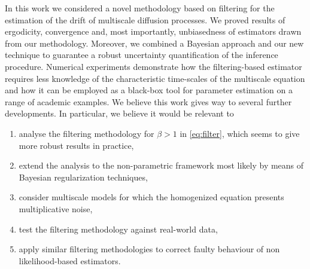 \documentclass[10pt]{article}
\begin{document}
In this work we considered a novel methodology based on filtering for the estimation of the drift of multiscale diffusion processes. We proved results of ergodicity, convergence and, most importantly, unbiasedness of estimators drawn from our methodology. Moreover, we combined a Bayesian approach and our new technique to guarantee a robust uncertainty quantification of the inference procedure. Numerical experiments demonstrate how the filtering-based estimator requires less knowledge of the characteristic time-scales of the multiscale equation and how it can be employed as a black-box tool for parameter estimation on a range of academic examples. We believe this work gives way to several further developments. In particular, we believe it would be relevant to 
\begin{enumerate}
	\item analyse the filtering methodology for $\beta > 1$ in \eqref{eq:filter}, which seems to give more robust results in practice,
	\item extend the analysis to the non-parametric framework most likely by means of Bayesian regularization techniques,
	\item consider multiscale models for which the homogenized equation presents multiplicative noise,
	\item test the filtering methodology against real-world data,
	\item apply similar filtering methodologies to correct faulty behaviour of non likelihood-based estimators.
\end{enumerate} 
\end{document}
